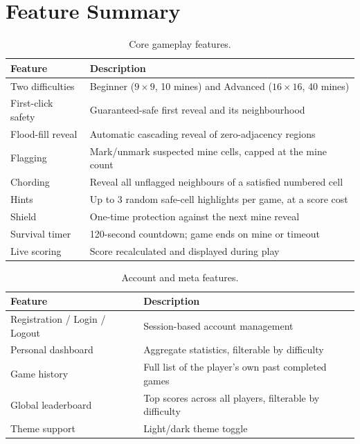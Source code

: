 \section{Feature Summary}

\begin{table}[h]
\centering
\caption{Core gameplay features.}
\label{tab:core-features}
\begin{tabular}{@{}p{4cm}p{9.5cm}@{}}
\toprule
\textbf{Feature} & \textbf{Description} \\
\midrule
Two difficulties & Beginner ($9\times9$, 10 mines) and Advanced ($16\times16$, 40 mines) \\
First-click safety & Guaranteed-safe first reveal and its neighbourhood \\
Flood-fill reveal & Automatic cascading reveal of zero-adjacency regions \\
Flagging & Mark/unmark suspected mine cells, capped at the mine count \\
Chording & Reveal all unflagged neighbours of a satisfied numbered cell \\
Hints & Up to 3 random safe-cell highlights per game, at a score cost \\
Shield & One-time protection against the next mine reveal \\
Survival timer & 120-second countdown; game ends on mine or timeout \\
Live scoring & Score recalculated and displayed during play \\
\bottomrule
\end{tabular}
\end{table}

\begin{table}[h]
\centering
\caption{Account and meta features.}
\label{tab:meta-features}
\begin{tabular}{@{}p{4cm}p{9.5cm}@{}}
\toprule
\textbf{Feature} & \textbf{Description} \\
\midrule
Registration / Login / Logout & Session-based account management \\
Personal dashboard & Aggregate statistics, filterable by difficulty \\
Game history & Full list of the player's own past completed games \\
Global leaderboard & Top scores across all players, filterable by difficulty \\
Theme support & Light/dark theme toggle \\
\bottomrule
\end{tabular}
\end{table}
